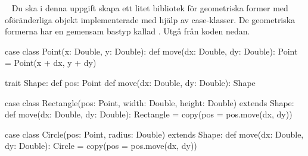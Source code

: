















\QUESTBEGIN

\Task  \what~  Du ska i denna uppgift skapa ett litet bibliotek för geometriska former med oföränderliga objekt implementerade med hjälp av case-klasser. De geometriska formerna har en gemensam bastyp kallad . Utgå från koden nedan.

\begin{CodeSmall}
case class Point(x: Double, y: Double):
  def move(dx: Double, dy: Double): Point = Point(x + dx, y + dy)

trait Shape:
  def pos: Point
  def move(dx: Double, dy: Double): Shape

case class Rectangle(pos: Point, width: Double, height: Double) extends Shape:
  def move(dx: Double, dy: Double): Rectangle = copy(pos = pos.move(dx, dy))

case class Circle(pos: Point, radius: Double) extends Shape:
  def move(dx: Double, dy: Double): Circle = copy(pos = pos.move(dx, dy))

\end{CodeSmall}

